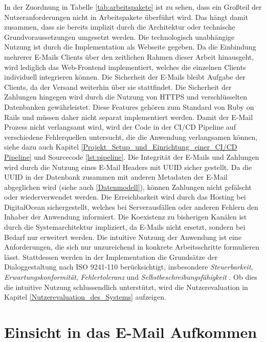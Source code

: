 In der Zuordnung in Tabelle \ref{tab:arbeitspakete} ist zu sehen, dass ein Großteil der Nutzeranforderungen nicht in Arbeitspakete überführt wird. Das hängt damit zusammen, dass sie bereits implizit durch die Architektur oder technische Grundvoraussetzungen umgesetzt werden. Die technologisch unabhängige Nutzung ist durch die Implementation als Webseite gegeben. Da die Einbindung mehrerer E-Mails Clients über den zeitlichen Rahmen dieser Arbeit hinausgeht, wird lediglich das Web-Frontend implementiert, welches die einzelnen Clients individuell integrieren können. Die Sicherheit der E-Mails bleibt Aufgabe der Clients, da der Versand weiterhin über sie stattfindet. Die Sicherheit der Zahlungen hingegen wird durch die Nutzung von HTTPS und verschlüsselten Datenbanken gewährleistet. Diese Features gehören zum Standard von Ruby on Rails und müssen daher nicht separat implementiert werden. Damit der E-Mail Prozess nicht verlangsamt wird, wird der Code in der CI/CD Pipeline auf verschiedene Fehlerquellen untersucht, die die Anwendung verlangsamen können, siehe dazu auch Kapitel \ref{Projekt_Setup_und_Einrichtung_einer_CI/CD Pipeline} und Sourcecode \ref{lst:pipeline}. Die Integrität der E-Mails und Zahlungen wird durch die Nutzung eines E-Mail Headers mit UUID sicher gestellt. Da die UUID in der Datenbank zusammen mit anderen Metadaten der E-Mail abgeglichen wird (siehe auch \ref{Datenmodell}), können Zahlungen nicht gefälscht oder wiederverwendet werden. Die Erreichbarkeit wird durch das Hosting bei DigitalOcean sichergestellt, welches bei Serverausfällen oder anderen Fehlern den Inhaber der Anwendung informiert. Die Koexistenz zu bisherigen Kanälen ist durch die Systemarchitektur impliziert, da E-Mails nicht ersetzt, sondern bei Bedarf nur erweitert werden. Die intuitive Nutzung der Anwendung ist eine Anforderungen, die sich nur unzureichend in konkrete Arbeitsschritte formulieren lässt. Stattdessen werden in der Implementation die Grundsätze der Dialoggestaltung nach ISO 9241-110 berücksichtigt, insbesondere \textit{Steuerbarkeit}, \textit{Erwartungskonformität}, \textit{Fehlertoleranz} und \textit{Selbstbeschreibungsfähigkeit} \citep{ISO9241-110}. Ob dies die intuitive Nutzung schlussendlich unterstützt, wird die Nutzerevaluation in Kapitel \ref{Nutzerevaluation_des_Systems} aufzeigen. 


\section{Einsicht in das E-Mail Aufkommen}
\label{Einsicht_in_das_E-Mail_Aufkommen}


